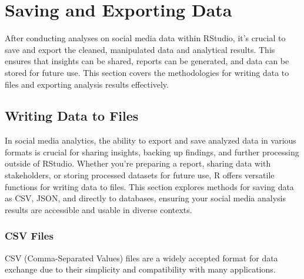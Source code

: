 \documentclass[
]{book}
\begin{document}
\hypertarget{saving-and-exporting-data}{%
\section{Saving and Exporting Data}\label{saving-and-exporting-data}}

After conducting analyses on social media data within RStudio, it's crucial to save and export the cleaned, manipulated data and analytical results. This ensures that insights can be shared, reports can be generated, and data can be stored for future use. This section covers the methodologies for writing data to files and exporting analysis results effectively.

\hypertarget{writing-data-to-files}{%
\subsection{Writing Data to Files}\label{writing-data-to-files}}

In social media analytics, the ability to export and save analyzed data in various formats is crucial for sharing insights, backing up findings, and further processing outside of RStudio. Whether you're preparing a report, sharing data with stakeholders, or storing processed datasets for future use, R offers versatile functions for writing data to files. This section explores methods for saving data as CSV, JSON, and directly to databases, ensuring your social media analysis results are accessible and usable in diverse contexts.

\hypertarget{csv-files-1}{%
\subsubsection{CSV Files}\label{csv-files-1}}

CSV (Comma-Separated Values) files are a widely accepted format for data exchange due to their simplicity and compatibility with many applications.
\end{document}
